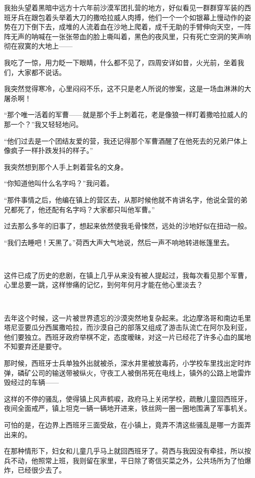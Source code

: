 \par 我抬头望着黑暗中远方十六年前沙漠军团扎营的地方，好似看见一群群穿军装的西班牙兵在跟包着头举着大刀的撒哈拉威人肉搏，他们一个一个如银幕上慢动作的姿势在刀下倒下去，成堆的人流着血在沙地上爬着，成千无助的手臂伸向天空，一阵阵无声的呐喊在一张张带血的脸上嘶叫着，黑色的夜风里，只有死亡空洞的笑声响彻在寂寞的大地上——
\par 我吃了一惊，用力眨一下眼睛，什么都不见了，四周安详如昔，火光前，坐着我们，大家都不说话。
\par 我突然觉得寒冷，心里闷闷不乐，这不只是老人所说的惨案，这是一场血淋淋的大屠杀啊！
\par “那个唯一活着的军曹——就是那个手上刺着花，老是像狼一样盯着撒哈拉威人的那一个？”我又轻轻地问。
\par “他们过去是一个团结友爱的营，我还记得那个军曹酒醒了在他死去的兄弟尸体上像疯子一样扑跌发抖的样子。”
\par 我突然想到那个人手上刺着营名的文身。
\par “你知道他叫什么名字吗？”我问着。
\par “那件事情之后，他编在镇上的营区去，从那时候他就不肯讲名字，他说全营的弟兄都死了，他还配有名字吗？大家都只叫他军曹。”
\par 过去那么多年的旧事了，想起来依然使我毛骨悚然，远处的沙地好似在扭动一般。
\par “我们去睡吧！天黑了。”荷西大声大气地说，然后一声不响地转进帐篷里去。
\par  
\par 这件已成了历史的悲剧，在镇上几乎从来没有被人提起过，我每次看见那个军曹，心里总要一跳，这样惨痛的记忆，到何年何月才能在他心里淡去？
\par  
\par 去年这个时候，这一片被世界遗忘的沙漠突然地复杂起来。北边摩洛哥和南边毛里塔尼亚要瓜分西属撒哈拉，而沙漠自己的部落又组成了游击队流亡在阿尔及利亚，他们要独立。西班牙政府举棋不定，态度暧昧，对这一片已经花了许多心血的属地不知要弃还是要守。
\par 那时候，西班牙士兵单独外出就被杀，深水井里被放毒药，小学校车里找出定时炸弹，磷矿公司的输送带被纵火，守夜工人被倒吊死在电线上，镇外的公路上地雷炸毁经过的车辆——
\par 这样的不停的骚乱，使得镇上风声鹤唳，政府马上关闭学校，疏散儿童回西班牙，夜间全面戒严，镇上坦克一辆一辆地开进来，铁丝网一圈一圈地围满了军事机关。
\par 可怕的是，在边界上西班牙三面受敌，在小镇上，竟弄不清这些骚乱是哪一方面弄出来的。
\par 在那种情形下，妇女和儿童几乎马上就回西班牙了。荷西与我因没有牵挂，所以按兵不动，他照常上班，我则留在家里，平日除了寄信买菜之外，公共场所为了怕爆炸，已经很少去了。
